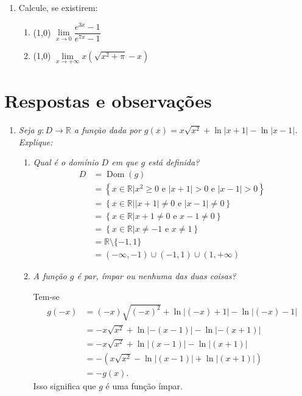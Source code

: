 \documentclass[12pt,a4paper]{article}
\newcommand*\abs[1]{\left|#1\right|}
\begin{document}
\begin{enumerate}
\item Calcule, se existirem:
\begin{enumerate}
\item (1,0) $\lim\limits_{x\to 0} \dfrac{e^{3x}-1}{e^{7x}-1}$
\item (1,0) $\lim\limits_{x\to +\infty} x(\sqrt{x^2 + \pi} - x)$
\end{enumerate}
\end{enumerate}

\newpage
\restoregeometry
\section*{Respostas e observações}

\begin{enumerate}
\item \textit{Seja $g: D \to \mathbb{R}$ a função dada por $g(x) = x\sqrt{x^2} + \ln{\abs{x + 1}} - \ln{\abs{x - 1}}$. Explique:}
\begin{enumerate}
\item \textit{Qual é o domínio $D$ em que $g$ está definida?}
\begin{align*}
D
& = \operatorname{Dom}(g) \\
& = \left\{ x \in \mathbb{R} | x^2 \geq 0 \text{ e } \abs{x+1} > 0 \text{ e } \abs{x-1} > 0 \right\} \\
& = \left\{ x \in \mathbb{R} | \abs{x+1} \neq 0 \text{ e } \abs{x-1} \neq 0 \right\} \\
& = \left\{ x \in \mathbb{R} | x+1 \neq 0 \text{ e } x-1 \neq 0 \right\} \\
& = \left\{ x \in \mathbb{R} | x \neq -1 \text{ e } x\neq 1 \right\} \\
& = \mathbb{R} \setminus \{-1, 1 \} \\
& = (-\infty, -1) \cup ( -1, 1) \cup ( 1, +\infty)
\end{align*}

\item \textit{A função $g$ é par, ímpar ou nenhuma das duas coisas?}

Tem-se
\begin{align*}
g(-x)
& = (-x)\sqrt{(-x)^2} + \ln{\abs{(-x) + 1}} - \ln{\abs{(-x) - 1}} \\
& = -x \sqrt{x^2} + \ln{\abs{-(x - 1)}} - \ln{\abs{-(x+1)}} \\
& = -x \sqrt{x^2} + \ln{\abs{(x - 1)}} - \ln{\abs{(x+1)}} \\
& = -( x \sqrt{x^2} - \ln{\abs{(x - 1)}} + \ln{\abs{(x+1)}} ) \\
& = -g(x).
\end{align*}
Isso significa que $g$ é uma função ímpar.


\end{enumerate}
\end{enumerate}
\end{document}
